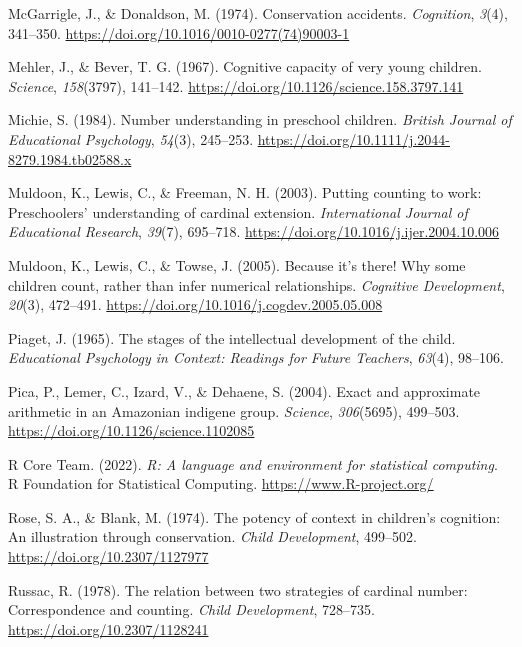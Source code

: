 \documentclass[
  man,floatsintext]{apa7}
\newlength{\cslhangindent}
\newenvironment{CSLReferences}[2] %
 {\begin{list}{}{%
  \setlength{\itemindent}{0pt}
  \setlength{\leftmargin}{0pt}
  \setlength{\parsep}{0pt}
  \ifodd #1
   \setlength{\leftmargin}{\cslhangindent}
   \setlength{\itemindent}{-1\cslhangindent}
  \fi
  \setlength{\itemsep}{#2\baselineskip}}}
 {\end{list}}
\begin{document}
\begin{CSLReferences}{1}{0}
McGarrigle, J., \& Donaldson, M. (1974). Conservation accidents. \emph{Cognition}, \emph{3}(4), 341--350. \url{https://doi.org/10.1016/0010-0277(74)90003-1}

Mehler, J., \& Bever, T. G. (1967). Cognitive capacity of very young children. \emph{Science}, \emph{158}(3797), 141--142. \url{https://doi.org/10.1126/science.158.3797.141}

Michie, S. (1984). Number understanding in preschool children. \emph{British Journal of Educational Psychology}, \emph{54}(3), 245--253. \url{https://doi.org/10.1111/j.2044-8279.1984.tb02588.x}

Muldoon, K., Lewis, C., \& Freeman, N. H. (2003). Putting counting to work: Preschoolers' understanding of cardinal extension. \emph{International Journal of Educational Research}, \emph{39}(7), 695--718. \url{https://doi.org/10.1016/j.ijer.2004.10.006}

Muldoon, K., Lewis, C., \& Towse, J. (2005). Because it's there! Why some children count, rather than infer numerical relationships. \emph{Cognitive Development}, \emph{20}(3), 472--491. \url{https://doi.org/10.1016/j.cogdev.2005.05.008}

Piaget, J. (1965). The stages of the intellectual development of the child. \emph{Educational Psychology in Context: Readings for Future Teachers}, \emph{63}(4), 98--106.

Pica, P., Lemer, C., Izard, V., \& Dehaene, S. (2004). Exact and approximate arithmetic in an {Amazonian} indigene group. \emph{Science}, \emph{306}(5695), 499--503. \url{https://doi.org/10.1126/science.1102085}

R Core Team. (2022). \emph{R: A language and environment for statistical computing}. R Foundation for Statistical Computing. \url{https://www.R-project.org/}

Rose, S. A., \& Blank, M. (1974). The potency of context in children's cognition: An illustration through conservation. \emph{Child Development}, 499--502. \url{https://doi.org/10.2307/1127977}

Russac, R. (1978). The relation between two strategies of cardinal number: Correspondence and counting. \emph{Child Development}, 728--735. \url{https://doi.org/10.2307/1128241}


\end{CSLReferences}
\end{document}

